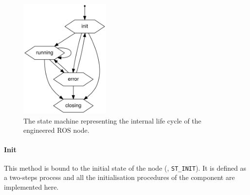 \begin{figure}[t]
    \centering
    \includegraphics[width=0.4\textwidth]{gfx/state_machine}
    \caption{The state machine representing the internal life cycle of the engineered ROS node.}\label{fig:state-machine}
\end{figure}

\paragraph{Init} This method is bound to the initial state of the node (\ie, \texttt{ST\_INIT}). It is defined as a two-steps process and all the initialisation procedures of the component are implemented here.


